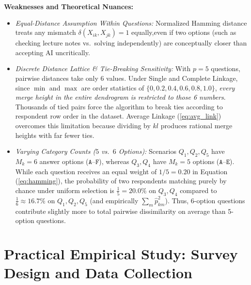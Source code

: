 \documentclass[11pt,a4paper]{article}
\begin{document}
\textbf{Weaknesses and Theoretical Nuances:}
\begin{itemize}
    \item \textit{Equal-Distance Assumption Within Questions:} Normalized Hamming distance treats any mismatch $\delta(X_{ik}, X_{jk}) = 1$ equally,even if two options (such as checking lecture notes vs.\ solving independently) are conceptually closer than accepting AI uncritically.
    \item \textit{Discrete Distance Lattice \& Tie-Breaking Sensitivity:} With $p = 5$ questions, pairwise distances take only $6$ values. Under Single and Complete Linkage, since $\min$ and $\max$ are order statistics of $\{0, 0.2, 0.4, 0.6, 0.8, 1.0\}$, \textit{every merge height in the entire dendrogram is restricted to those 6 numbers}. Thousands of tied pairs force the algorithm to break ties according to respondent row order in the dataset. Average Linkage (\ref{eq:avg_link}) overcomes this limitation because dividing by $kl$ produces rational merge heights with far fewer ties.
    \item \textit{Varying Category Counts ($5$ vs.\ $6$ Options):} Scenarios $Q_1, Q_2, Q_5$ have $M_k = 6$ answer options ($\texttt{A}$--$\texttt{F}$), whereas $Q_3, Q_4$ have $M_k = 5$ options ($\texttt{A}$--$\texttt{E}$). While each question receives an equal weight of $1/5 = 0.20$ in Equation (\ref{eq:hamming}), the probability of two respondents matching purely by chance under uniform selection is $\frac{1}{5} = 20.0\%$ on $Q_3, Q_4$ compared to $\frac{1}{6} \approx 16.7\%$ on $Q_1, Q_2, Q_5$ (and empirically $\sum_{m} \hat{p}_{km}^2$). Thus, 6-option questions contribute slightly more to total pairwise dissimilarity on average than 5-option questions.
\end{itemize}

\section{Practical Empirical Study: Survey Design and Data Collection}
\end{document}
